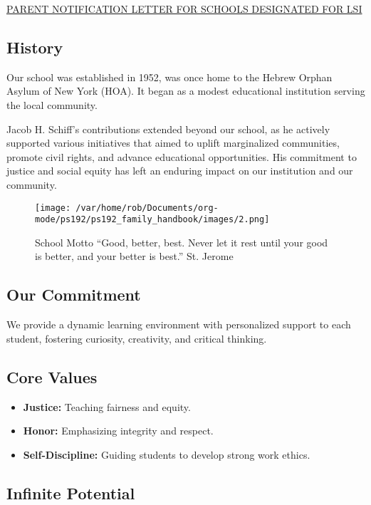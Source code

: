 \documentclass[letterpaper, 11pt]{article}
\begin{document}
\href{https://4.files.edl.io/760e/02/07/24/000734-b96f6af6-0f19-4829-999f-2eb23313280d.pdf}{PARENT NOTIFICATION LETTER FOR SCHOOLS DESIGNATED FOR LSI}

\subsection{History}
\label{sec:orgcd410ce}

Our school was established in 1952, was once home to the Hebrew Orphan Asylum of New York (HOA). It began as a modest educational institution serving the local community.

Jacob H. Schiff’s contributions extended beyond our school, as he actively supported various initiatives that aimed to uplift marginalized communities, promote civil rights, and advance educational opportunities. His commitment to justice and social equity has left an enduring impact on our institution and our community.

\begin{figure}[htbp]
\centering
\texttt{[image: /var/home/rob/Documents/org-mode/ps192/ps192\_family\_handbook/images/2.png]}
\caption{School Motto ``Good, better, best. Never let it rest until your good is better, and your better is best.'' St. Jerome}
\end{figure}

\subsection{Our Commitment}
\label{sec:orga6f5935}

We provide a dynamic learning environment with personalized support to each student, fostering curiosity, creativity, and critical thinking.

\subsection{Core Values}
\label{sec:org56f23cd}

\begin{itemize}
\item \textbf{\textbf{Justice:}} Teaching fairness and equity.
\item \textbf{\textbf{Honor:}} Emphasizing integrity and respect.
\item \textbf{\textbf{Self-Discipline:}} Guiding students to develop strong work ethics.
\end{itemize}

\subsection{Infinite Potential}
\label{sec:org7445d91}
\end{document}
